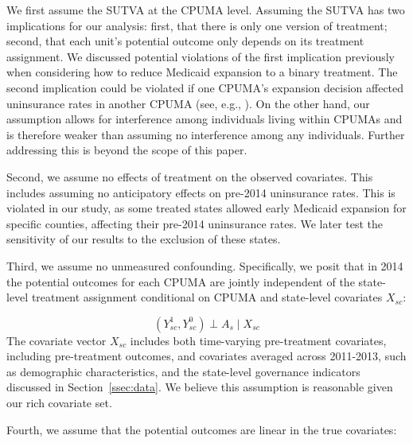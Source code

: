 \documentclass[aoas]{imsart}
\theoremstyle{plain}
\theoremstyle{remark}
\begin{document}
We first assume the SUTVA at the CPUMA level. Assuming the SUTVA has two implications for our analysis: first, that there is only one version of treatment; second, that each unit's potential outcome only depends on its treatment assignment. We discussed potential violations of the first implication previously when considering how to reduce Medicaid expansion to a binary treatment. The second implication could be violated if one CPUMA's expansion decision affected uninsurance rates in another CPUMA (see, e.g., \cite{frean2017premium}). On the other hand, our assumption allows for interference among individuals living within CPUMAs and is therefore weaker than assuming no interference among any individuals. Further addressing this is beyond the scope of this paper.

Second, we assume no effects of treatment on the observed covariates. This includes assuming no anticipatory effects on pre-2014 uninsurance rates. This is violated in our study, as some treated states allowed early Medicaid expansion for specific counties, affecting their pre-2014 uninsurance rates. We later test the sensitivity of our results to the exclusion of these states.

Third, we assume no unmeasured confounding. Specifically, we posit that in 2014 the potential outcomes for each CPUMA are jointly independent of the state-level treatment assignment conditional on CPUMA and state-level covariates $X_{sc}$: 

\begin{equation}\label{eqn:unconfoundedness}
(Y_{sc}^1, Y_{sc}^0) \perp A_s \mid X_{sc} 
\end{equation}
The covariate vector $X_{sc}$ includes both time-varying pre-treatment covariates, including pre-treatment outcomes, and covariates averaged across 2011-2013, such as demographic characteristics, and the state-level governance indicators discussed in Section~\ref{ssec:data}. We believe this assumption is reasonable given our rich covariate set. 

Fourth, we assume that the potential outcomes are linear in the true covariates:
\end{document}
